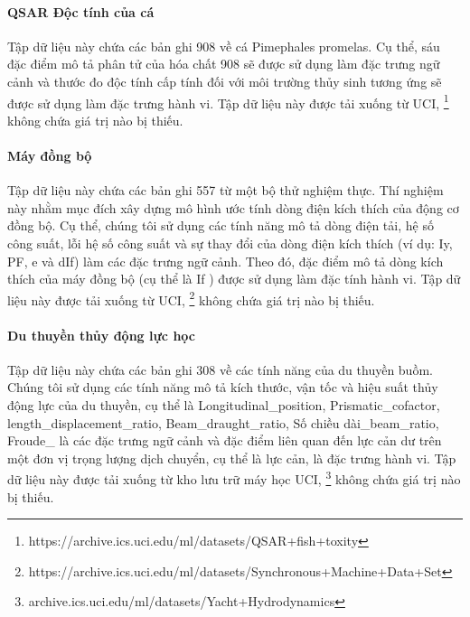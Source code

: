\paragraph{QSAR Độc tính của cá} Tập dữ liệu này chứa các bản ghi 908 về cá Pimephales promelas. Cụ thể, sáu đặc điểm mô tả phân tử của hóa chất 908 sẽ được sử dụng làm đặc trưng ngữ cảnh và thước đo độc tính cấp tính đối với môi trường thủy sinh tương ứng sẽ được sử dụng làm đặc trưng hành vi. Tập dữ liệu này được tải xuống từ UCI, \footnote{https://archive.ics.uci.edu/ml/datasets/QSAR+fish+toxity} không chứa giá trị nào bị thiếu.

\paragraph{Máy đồng bộ } Tập dữ liệu này chứa các bản ghi 557 từ một bộ thử nghiệm thực. Thí nghiệm này nhằm mục đích xây dựng mô hình ước tính dòng điện kích thích của động cơ đồng bộ. Cụ thể, chúng tôi sử dụng các tính năng mô tả dòng điện tải, hệ số công suất, lỗi hệ số công suất và sự thay đổi của dòng điện kích thích (ví dụ: Iy, PF, e và dIf) làm các đặc trưng ngữ cảnh. Theo đó, đặc điểm mô tả
dòng kích thích của máy đồng bộ (cụ thể là If ) được sử dụng làm đặc tính hành vi. Tập dữ liệu này được tải xuống từ UCI, \footnote{https://archive.ics.uci.edu/ml/datasets/Synchronous+Machine+Data+Set} không chứa giá trị nào bị thiếu.


\paragraph{Du thuyền thủy động lực học } Tập dữ liệu này chứa các bản ghi 308 về các tính năng của du thuyền buồm. Chúng tôi sử dụng các tính năng mô tả kích thước, vận tốc và hiệu suất thủy động lực của du thuyền, cụ thể là Longitudinal\_position, Prismatic\_cofactor, length\_displacement\_ratio, Beam\_draught\_ratio, Số chiều dài\_beam\_ratio, Froude\_ là các đặc trưng ngữ cảnh và đặc điểm liên quan đến lực cản dư trên một đơn vị trọng lượng dịch chuyển, cụ thể là lực cản, là đặc trưng hành vi. Tập dữ liệu này được tải xuống từ kho lưu trữ máy học UCI, \footnote{archive.ics.uci.edu/ml/datasets/Yacht+Hydrodynamics} không chứa giá trị nào bị thiếu.

